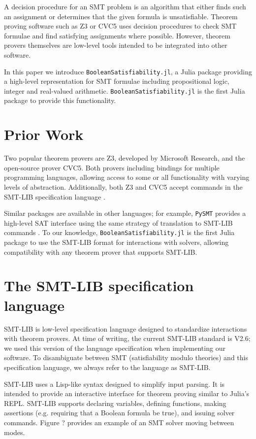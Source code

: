 \documentclass[conference]{IEEEtran}
\begin{document}
A decision procedure for an SMT problem is an algorithm that either finds such an assignment or determines that the given formula is unsatisfiable.  Theorem proving software such as Z3 or CVC5 \cite{z3, cvc5}
uses decision procedures to check SMT formulae and find satisfying assignments where possible. However, theorem provers themselves are low-level tools intended to be integrated into other software.

In this paper we introduce \verb|BooleanSatisfiability.jl|, a Julia package providing a high-level representation for SMT formulae including propositional logic, integer and real-valued arithmetic.%
\verb|BooleanSatisfiability.jl| is the first Julia package to provide this functionality.

\section{Prior Work}
Two popular theorem provers are Z3, developed by Microsoft Research, and the open-source prover CVC5. Both provers including bindings for multiple programming languages, allowing access to some or all functionality with varying levels of abstraction. Additionally, both Z3 and CVC5 accept commands in the SMT-LIB specification language \cite{smtlib2}.

Similar packages are available in other languages; for example, \verb|PySMT| provides a high-level SAT interface using the same strategy of translation to SMT-LIB commands \cite{pysmt2015}.
To our knowledge, \verb|BooleanSatisfiability.jl| is the first Julia package to use the SMT-LIB format for interactions with solvers, allowing compatibility with any theorem prover that supports SMT-LIB.

\section{The SMT-LIB specification language}
SMT-LIB is low-level specification language designed to standardize interactions with theorem provers. At time of writing, the current SMT-LIB standard is V2.6; we used this version of the language specification when implementing our software. To disambiguate between SMT (satisfiability modulo theories) and this specification language, we always refer to the language as SMT-LIB.

SMT-LIB uses a Lisp-like syntax designed to simplify input parsing. It is intended to provide an interactive interface for theorem proving similar to Julia's REPL. SMT-LIB supports declaring variables, defining functions, making assertions (e.g. requiring that a Boolean formula be true), and issuing solver commands. Figure ? %
provides an example of an SMT solver moving between modes.
\end{document}
